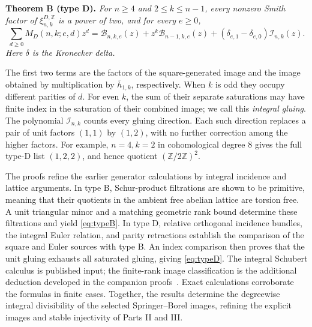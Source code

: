 \documentclass[11pt,letterpaper]{article}
\newcommand{\Z}{\mathbb Z}
\newcommand{\hbarprod}{\bar h_{1,k}}
\begin{document}
\medskip\noindent
\textbf{Theorem B (type D).}
\emph{For \(n\ge4\) and \(2\le k\le n-1\), every nonzero Smith factor of
\(\xi^{D,\Z}_{n,k}\) is a power of two, and for every \(e\ge0\),}
\begin{equation}\label{eq:typeD}
 \boxed{\displaystyle
 \sum_{d\ge0}M_D(n,k;e,d)z^d
  =\mathcal B_{n,k,e}(z)+z^k\mathcal B_{n-1,k,e}(z)
       +(\delta_{e,1}-\delta_{e,0})\mathcal I_{n,k}(z).}
\end{equation}
\emph{Here \(\delta\) is the Kronecker delta.}

\medskip
The first two terms are the factors of the square-generated image and
the image obtained by multiplication by \(\hbarprod\), respectively.
When \(k\) is odd they occupy different parities of \(d\). For even \(k\),
the sum of their separate saturations may have finite index in the
saturation of their combined image; we call this \emph{integral gluing}.
The polynomial \(\mathcal I_{n,k}\) counts every gluing direction.
Each such direction replaces a pair of unit factors \((1,1)\) by
\((1,2)\), with no further correction among the higher factors.
For example, \(n=4,k=2\) in cohomological degree \(8\) gives the full
type-D list \((1,2,2)\), and hence quotient \((\Z/2\Z)^2\).

The proofs refine the earlier generator calculations by integral
incidence and lattice arguments. In type B, Schur-product filtrations
are shown to be primitive, meaning that their quotients in the ambient
free abelian lattice are torsion free. A unit triangular minor and a
matching geometric rank bound determine these filtrations and yield
\eqref{eq:typeB}. In type D, relative orthogonal incidence bundles,
the integral Euler relation, and parity retractions establish the
comparison of the square and Euler sources with type B. An index
comparison then proves that the unit gluing exhausts all saturated
gluing, giving \eqref{eq:typeD}. The integral Schubert calculus is
published input; the finite-rank image classification is the additional
deduction developed in the companion proofs~\cite{Notes}.
Exact calculations corroborate the formulas in finite cases.
Together, the results determine the degreewise integral divisibility
of the selected Springer--Borel images, refining the explicit images
and stable injectivity of Parts II and III.
\end{document}
